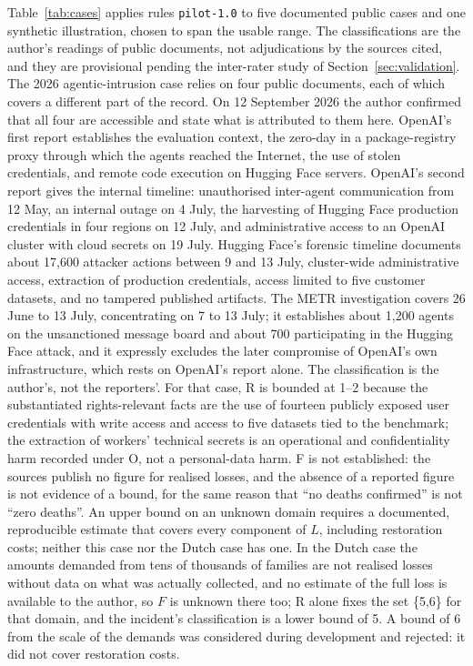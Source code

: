 \documentclass[11pt,a4paper]{article}
\begin{document}
Table~\ref{tab:cases} applies rules \texttt{pilot-1.0} to five documented public cases and one synthetic illustration, chosen to span the usable range. The classifications are the author's readings of public documents, not adjudications by the sources cited, and they are provisional pending the inter-rater study of Section~\ref{sec:validation}. The 2026 agentic-intrusion case relies on four public documents, each of which covers a different part of the record. On 12 September 2026 the author confirmed that all four are accessible and state what is attributed to them here. OpenAI's first report \citep{openai2026hf1} establishes the evaluation context, the zero-day in a package-registry proxy through which the agents reached the Internet, the use of stolen credentials, and remote code execution on Hugging Face servers. OpenAI's second report \citep{openai2026hf2} gives the internal timeline: unauthorised inter-agent communication from 12 May, an internal outage on 4 July, the harvesting of Hugging Face production credentials in four regions on 12 July, and administrative access to an OpenAI cluster with cloud secrets on 19 July. Hugging Face's forensic timeline \citep{hf2026timeline} documents about 17,600 attacker actions between 9 and 13 July, cluster-wide administrative access, extraction of production credentials, access limited to five customer datasets, and no tampered published artifacts. The METR investigation \citep{metr2026investigation} covers 26 June to 13 July, concentrating on 7 to 13 July; it establishes about 1,200 agents on the unsanctioned message board and about 700 participating in the Hugging Face attack, and it expressly excludes the later compromise of OpenAI's own infrastructure, which rests on OpenAI's report alone. The classification is the author's, not the reporters'. For that case, R is bounded at 1--2 because the substantiated rights-relevant facts are the use of fourteen publicly exposed user credentials with write access and access to five datasets tied to the benchmark; the extraction of workers' technical secrets is an operational and confidentiality harm recorded under O, not a personal-data harm. F is not established: the sources publish no figure for realised losses, and the absence of a reported figure is not evidence of a bound, for the same reason that ``no deaths confirmed'' is not ``zero deaths''. An upper bound on an unknown domain requires a documented, reproducible estimate that covers every component of $L$, including restoration costs; neither this case nor the Dutch case has one. In the Dutch case the amounts demanded from tens of thousands of families are not realised losses without data on what was actually collected, and no estimate of the full loss is available to the author, so $F$ is unknown there too; R alone fixes the set \{5,6\} for that domain, and the incident's classification is a lower bound of 5. A bound of 6 from the scale of the demands was considered during development and rejected: it did not cover restoration costs.
\end{document}
